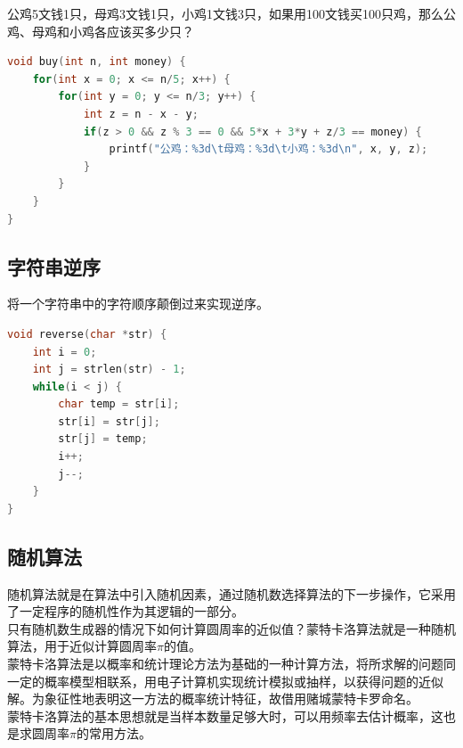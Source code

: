 公鸡5文钱1只，母鸡3文钱1只，小鸡1文钱3只，如果用100文钱买100只鸡，那么公鸡、母鸡和小鸡各应该买多少只？

\begin{lstlisting}[language=C]
void buy(int n, int money) {
	for(int x = 0; x <= n/5; x++) {
		for(int y = 0; y <= n/3; y++) {
			int z = n - x - y;
			if(z > 0 && z % 3 == 0 && 5*x + 3*y + z/3 == money) {
				printf("公鸡：%3d\t母鸡：%3d\t小鸡：%3d\n", x, y, z);
			}
		}
	}
}
\end{lstlisting}

\vspace{0.5cm}

\subsection{字符串逆序}

将一个字符串中的字符顺序颠倒过来实现逆序。\\


\begin{lstlisting}[language=C]
void reverse(char *str) {
	int i = 0;
	int j = strlen(str) - 1;
	while(i < j) {
		char temp = str[i];
		str[i] = str[j];
		str[j] = temp;
		i++;
		j--;
	}
}
\end{lstlisting}

\vspace{0.5cm}

\subsection{随机算法}

随机算法就是在算法中引入随机因素，通过随机数选择算法的下一步操作，它采用了一定程序的随机性作为其逻辑的一部分。\\

只有随机数生成器的情况下如何计算圆周率的近似值？蒙特卡洛算法就是一种随机算法，用于近似计算圆周率$ \pi $的值。\\

蒙特卡洛算法是以概率和统计理论方法为基础的一种计算方法，将所求解的问题同一定的概率模型相联系，用电子计算机实现统计模拟或抽样，以获得问题的近似解。为象征性地表明这一方法的概率统计特征，故借用赌城蒙特卡罗命名。\\

蒙特卡洛算法的基本思想就是当样本数量足够大时，可以用频率去估计概率，这也是求圆周率$ \pi $的常用方法。

